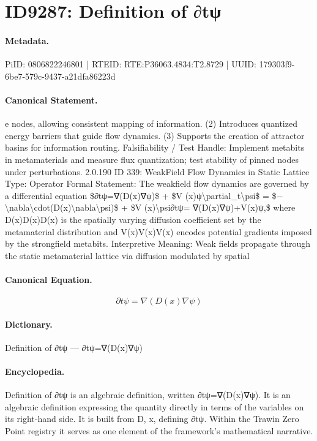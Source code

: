 \section*{ID9287: Definition of ∂tψ}
\paragraph{Metadata.}
PiID: 0806822246801 | RTEID: RTE:P36063.4834:T2.8729 | UUID: 179303f9-6be7-579c-9437-a21dfa86223d

\paragraph{Canonical Statement.}
e nodes, allowing consistent mapping of information. (2) Introduces quantized energy barriers that guide flow dynamics. (3) Supports the creation of attractor basins for information routing. Falsifiability / Test Handle: Implement metabits in metamaterials and measure flux quantization; test stability of pinned nodes under perturbations. 2.0.190 ID 339: WeakField Flow Dynamics in Static Lattice Type: Operator Formal Statement: The weakfield flow dynamics are governed by a differential equation \$∂tψ=∇(D(x)∇ψ)\$ + \$V (x)ψ\textbackslash{}partial\_t\textbackslash{}psi\$ = \$−\textbackslash{}nabla\textbackslash{}cdot(D(x)\textbackslash{}nabla\textbackslash{}psi)\$ + \$V (x)\textbackslash{}psi∂tψ= ∇(D(x)∇ψ)+V(x)ψ,\$ where D(x)D(x)D(x) is the spatially varying diffusion coefficient set by the metamaterial distribution and V(x)V(x)V(x) encodes potential gradients imposed by the strongfield metabits. Interpretive Meaning: Weak fields propagate through the static metamaterial lattice via diffusion modulated by spatial

\paragraph{Canonical Equation.}
\[
∂tψ=∇(D(x)∇ψ)
\]

\paragraph{Dictionary.}
Definition of ∂tψ — ∂tψ=∇(D(x)∇ψ)

\paragraph{Encyclopedia.}
Definition of ∂tψ is an algebraic definition, written ∂tψ=∇(D(x)∇ψ). It is an algebraic definition expressing the quantity directly in terms of the variables on its right-hand side. It is built from D, x, defining ∂tψ. Within the Trawin Zero Point registry it serves as one element of the framework's mathematical narrative.

